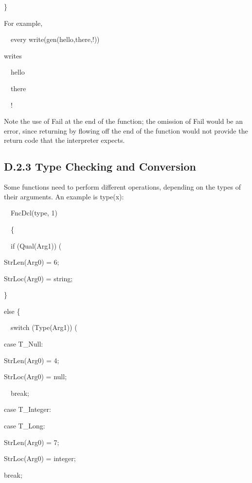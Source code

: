 {\ttfamily\mdseries
\}}


For example,

{\ttfamily\mdseries
\ \ every
write(gen({\textquotedbl}hello{\textquotedbl},{\textquotedbl}there{\textquotedbl},{\textquotedbl}!{\textquotedbl}))}


writes

{\ttfamily\mdseries
\ \ hello}

{\ttfamily\mdseries
\ \ there}

{\ttfamily\mdseries
\ \ !}


Note the use of Fail at the end of the function; the omission of Fail
would be an error, since returning by flowing off the end of the
function would not provide the return code that the interpreter
expects.

\subsection{D.2.3 Type Checking and Conversion}

Some functions need to perform different operations, depending on the
types of their arguments. An example is type(x):

{\ttfamily\mdseries
\ \ FncDcl(type, 1)}

{\ttfamily\mdseries
\ \ \{}

{\ttfamily\mdseries
\ \ if (Qual(Arg1)) (}

{\ttfamily\mdseries
StrLen(Arg0) = 6;}

{\ttfamily\mdseries
StrLoc(Arg0) = {\textquotedbl}string{\textquotedbl};}

{\ttfamily\mdseries
\}}

{\ttfamily\mdseries
else \{}

{\ttfamily\mdseries
\ \ switch (Type(Arg1)) (}

{\ttfamily\mdseries
case T\_Null:}

{\ttfamily\mdseries
StrLen(Arg0) = 4;}

{\ttfamily\mdseries
StrLoc(Arg0) = {\textquotedbl}null{\textquotedbl};}

{\ttfamily\mdseries
\ \ break;}

{\ttfamily\mdseries
case T\_Integer:}

{\ttfamily\mdseries
case T\_Long:}

{\ttfamily\mdseries
StrLen(Arg0) = 7;}

{\ttfamily\mdseries
StrLoc(Arg0) = {\textquotedbl}integer{\textquotedbl};}

{\ttfamily\mdseries
break;}

